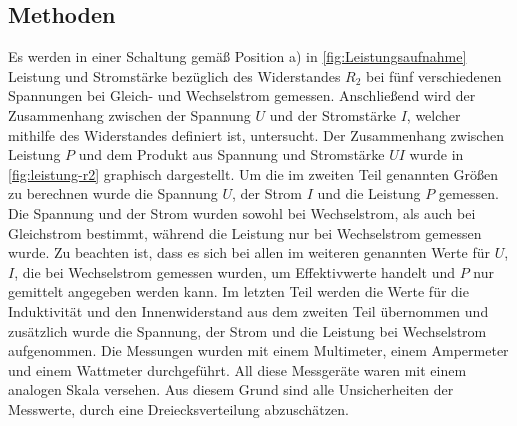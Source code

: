 \subsection{Methoden}\label{kap:MethodenS}
Es werden in einer Schaltung gemäß Position a) in \cref{fig:Leistungsaufnahme} Leistung und Stromstärke bezüglich des Widerstandes $R_2$ bei fünf verschiedenen Spannungen bei Gleich- und Wechselstrom gemessen.
Anschließend wird der Zusammenhang zwischen der Spannung $U$ und der Stromstärke $I$, welcher mithilfe des Widerstandes definiert ist, untersucht.
Der Zusammenhang zwischen Leistung $P$ und dem Produkt aus Spannung und Stromstärke $UI$ wurde in \cref{fig:leistung-r2} graphisch dargestellt.
Um die im zweiten Teil genannten Größen zu berechnen wurde die Spannung $U$, der Strom $I$ und die Leistung $P$ gemessen. 
Die Spannung und der Strom wurden sowohl bei Wechselstrom, als auch bei Gleichstrom bestimmt, während die Leistung nur bei Wechselstrom gemessen wurde. Zu beachten ist, dass es sich bei allen im weiteren genannten Werte für $U$, $I$, die bei Wechselstrom gemessen wurden, um Effektivwerte handelt und $P$ nur gemittelt angegeben werden kann.
Im letzten Teil werden die Werte für die Induktivität und den Innenwiderstand aus dem zweiten Teil übernommen und zusätzlich wurde die Spannung, der Strom und die Leistung bei Wechselstrom aufgenommen.
Die Messungen wurden mit einem Multimeter, einem Ampermeter und einem Wattmeter durchgeführt.
All diese Messgeräte waren mit einem analogen Skala versehen. Aus diesem Grund sind alle Unsicherheiten der Messwerte, durch eine Dreiecksverteilung abzuschätzen. 
